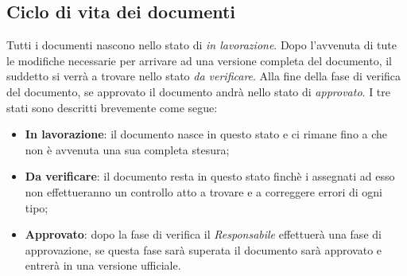 \subsection{Ciclo di vita dei documenti}
Tutti i documenti nascono nello stato di \textit{in lavorazione}.
Dopo l'avvenuta di tute le modifiche necessarie per arrivare ad una versione completa del documento, il suddetto si verrà a trovare nello stato \textit{da verificare}.
Alla fine della fase di verifica del documento, se approvato il documento andrà nello stato di \textit{approvato}.
I tre stati sono descritti brevemente come segue:
\begin{itemize}
\item \textbf{In lavorazione}: il documento nasce in questo stato e ci rimane fino a che non è avvenuta una sua completa stesura;
\item \textbf{Da verificare}: il documento resta in questo stato finchè i  assegnati ad esso non effettueranno un controllo atto a trovare e a correggere errori di ogni tipo;
\item \textbf{Approvato}: dopo la fase di verifica il \textit{Responsabile} effettuerà una fase di approvazione, se questa fase sarà superata il documento sarà approvato e entrerà in una versione ufficiale.
\end{itemize}